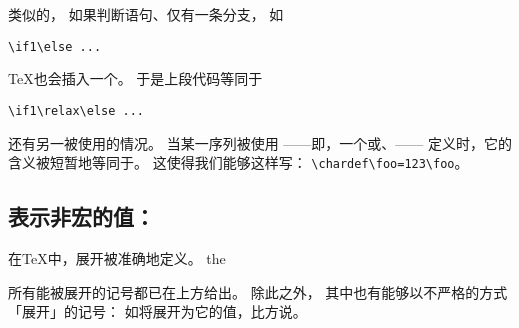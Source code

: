 \documentclass{book}
\begin{document}
类似的，
如果判断语句、仅有一条分支，
如
\begin{verbatim}
\if1\else ...
\end{verbatim}
{\TeX}也会插入一个。
于是上段代码等同于
\begin{verbatim}
\if1\relax\else ...
\end{verbatim}

还有另一被使用的情况。
当某一序列被使用
——即，一个或、——
定义时，它的含义被短暂地等同于。
这使得我们能够这样写：
\verb>\chardef\foo=123\foo>。

\subsection{表示非宏的值：}

在{\TeX}中，展开被准确地定义。
\cstoidx the\par
所有能被展开的记号都已在上方给出。
除此之外，
其中也有能够以不严格的方式「展开」的记号：
如将展开为它的值，比方说\n{20pt}。
\end{document}
